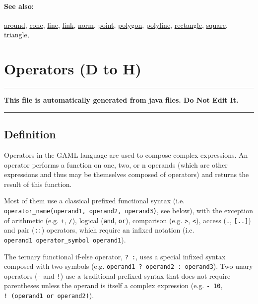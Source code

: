 \documentclass[]{book}
\theoremstyle{definition}
\theoremstyle{definition}
\theoremstyle{definition}
\theoremstyle{remark}
\begin{document}
\subsubsection{See also:}\label{see-also-75}

\href{operators-a-to-a.html\#around}{around},
\href{operators-b-to-c.html\#cone}{cone},
\href{operators-i-to-m.html\#line}{line},
\href{operators-i-to-m.html\#link}{link},
\href{operators-n-to-r.html\#norm}{norm},
\href{operators-n-to-r.html\#point}{point},
\href{operators-n-to-r.html\#polygon}{polygon},
\href{operators-n-to-r.html\#polyline}{polyline},
\href{operators-n-to-r.html\#rectangle}{rectangle},
\href{operators-s-to-z.html\#square}{square},
\href{operators-s-to-z.html\#triangle}{triangle},

\chapter{Operators (D to H)}\label{operators-d-to-h}

\begin{center}\rule{0.5\linewidth}{\linethickness}\end{center}

\textbf{This file is automatically generated from java files. Do Not
Edit It.}

\begin{center}\rule{0.5\linewidth}{\linethickness}\end{center}

\section{Definition}\label{definition-2}

Operators in the GAML language are used to compose complex expressions.
An operator performs a function on one, two, or n operands (which are
other expressions and thus may be themselves composed of operators) and
returns the result of this function.

Most of them use a classical prefixed functional syntax (i.e.
\texttt{operator\_name(operand1,\ operand2,\ operand3)}, see below),
with the exception of arithmetic (e.g. \texttt{+}, \texttt{/}), logical
(\texttt{and}, \texttt{or}), comparison (e.g. \texttt{\textgreater{}},
\texttt{\textless{}}), access (\texttt{.}, \texttt{{[}..{]}}) and pair
(\texttt{::}) operators, which require an infixed notation (i.e.
\texttt{operand1\ operator\_symbol\ operand1}).

The ternary functional if-else operator, \texttt{?\ :}, uses a special
infixed syntax composed with two symbols (e.g.
\texttt{operand1\ ?\ operand2\ :\ operand3}). Two unary operators
(\texttt{-} and \texttt{!}) use a traditional prefixed syntax that does
not require parentheses unless the operand is itself a complex
expression (e.g. \texttt{-\ 10}, \texttt{!\ (operand1\ or\ operand2)}).
\end{document}
